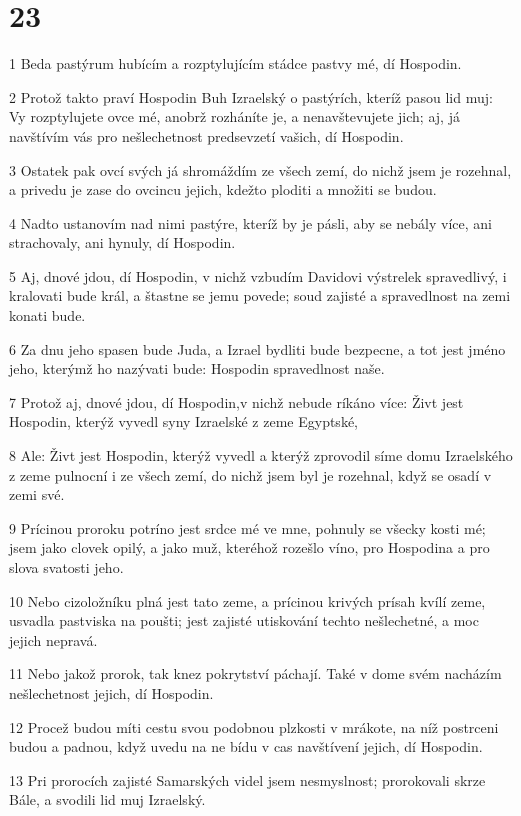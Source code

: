 \chapter{23}

\par 1 Beda pastýrum hubícím a rozptylujícím stádce pastvy mé, dí Hospodin.
\par 2 Protož takto praví Hospodin Buh Izraelský o pastýrích, kteríž pasou lid muj: Vy rozptylujete ovce mé, anobrž rozháníte je, a nenavštevujete jich; aj, já navštívím vás pro nešlechetnost predsevzetí vašich, dí Hospodin.
\par 3 Ostatek pak ovcí svých já shromáždím ze všech zemí, do nichž jsem je rozehnal, a privedu je zase do ovcincu jejich, kdežto ploditi a množiti se budou.
\par 4 Nadto ustanovím nad nimi pastýre, kteríž by je pásli, aby se nebály více, ani strachovaly, ani hynuly, dí Hospodin.
\par 5 Aj, dnové jdou, dí Hospodin, v nichž vzbudím Davidovi výstrelek spravedlivý, i kralovati bude král, a štastne se jemu povede; soud zajisté a spravedlnost na zemi konati bude.
\par 6 Za dnu jeho spasen bude Juda, a Izrael bydliti bude bezpecne, a tot jest jméno jeho, kterýmž ho nazývati bude: Hospodin spravedlnost naše.
\par 7 Protož aj, dnové jdou, dí Hospodin,v nichž nebude ríkáno více: Živt jest Hospodin, kterýž vyvedl syny Izraelské z zeme Egyptské,
\par 8 Ale: Živt jest Hospodin, kterýž vyvedl a kterýž zprovodil síme domu Izraelského z zeme pulnocní i ze všech zemí, do nichž jsem byl je rozehnal, když se osadí v zemi své.
\par 9 Prícinou proroku potríno jest srdce mé ve mne, pohnuly se všecky kosti mé; jsem jako clovek opilý, a jako muž, kteréhož rozešlo víno, pro Hospodina a pro slova svatosti jeho.
\par 10 Nebo cizoložníku plná jest tato zeme, a prícinou krivých prísah kvílí zeme, usvadla pastviska na poušti; jest zajisté utiskování techto nešlechetné, a moc jejich nepravá.
\par 11 Nebo jakož prorok, tak knez pokrytství páchají. Také v dome svém nacházím nešlechetnost jejich, dí Hospodin.
\par 12 Procež budou míti cestu svou podobnou plzkosti v mrákote, na níž postrceni budou a padnou, když uvedu na ne bídu v cas navštívení jejich, dí Hospodin.
\par 13 Pri prorocích zajisté Samarských videl jsem nesmyslnost; prorokovali skrze Bále, a svodili lid muj Izraelský.
